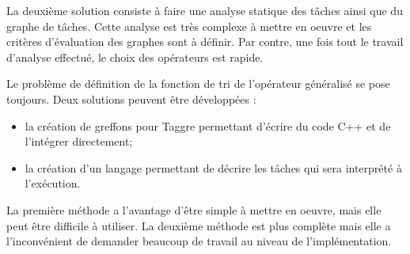 La deuxième solution consiste à faire une analyse statique des tâches ainsi que du graphe de tâches.
%
Cette analyse est très complexe à mettre en oeuvre et les critères d'évaluation des graphes sont à définir.
%
Par contre, une fois tout le travail d'analyse effectué, le choix des opérateurs est rapide.


Le problème de définition de la fonction de tri de l'opérateur généralisé se pose toujours.
%
Deux solutions peuvent être développées :
\begin{itemize}
  \item la création de greffons pour Taggre permettant d'écrire du code C++ et de l'intégrer directement;
  \item la création d'un langage permettant de décrire les tâches qui sera interprété à l'exécution.
\end{itemize}
%
La première méthode a l'avantage d'être simple à mettre en oeuvre, mais elle peut être difficile à utiliser.
%
La deuxième méthode est plus complète mais elle a l'inconvénient de demander beaucoup de travail au niveau de l'implémentation.


